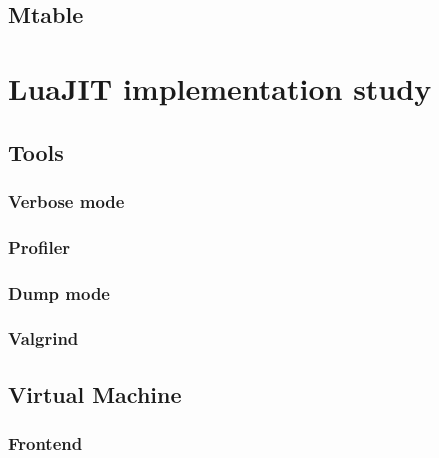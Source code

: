 \documentclass[12pt, oneside]{Thesis}
\begin{document}
  \chapter{Mtable}
  \label{Chapt:mtable}

\part{LuaJIT implementation study}
\label{Part:luajit-doc}

  \chapter{Tools}
  \label{Chapt:Tools}

    \section{Verbose mode}
    \label{Sec:Verbose}
    

    \section{Profiler}
    \label{Sec:Profiler}
    

    \section{Dump mode}
    \label{Sec:Dump-mode}
    

    \section{Valgrind}
    \label{Sec:Valgrind}
    

  \chapter{Virtual Machine}
  \label{Chapt:VM}

    \section{Frontend}
    \label{Sec:frontend}
    
\end{document}

